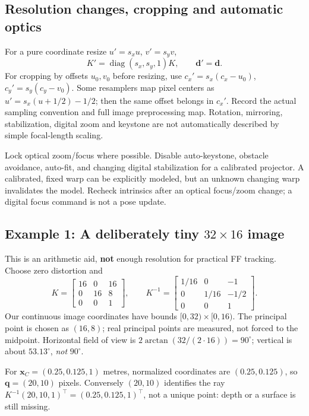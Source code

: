 \documentclass[11pt,a4paper]{article}
\newcommand{\pt}[1]{\bm{x}_{#1}}
\begin{document}
\subsection{Resolution changes, cropping and automatic optics}
For a pure coordinate resize $u'=s_xu$, $v'=s_yv$,
\begin{equation}
K'=\operatorname{diag}(s_x,s_y,1)K,\qquad \bm{d}'=\bm{d}.
\label{eq:resize}
\end{equation}
For cropping by offsets $u_0,v_0$ before resizing, use
$c_x'=s_x(c_x-u_0)$, $c_y'=s_y(c_y-v_0)$.
Some resamplers map pixel centers as
$u'=s_x(u+1/2)-1/2$; then the same offset belongs in $c_x'$.
Record the actual sampling convention and full image preprocessing map.
Rotation, mirroring, stabilization, digital zoom and keystone are not
automatically described by simple focal-length scaling.

Lock optical zoom/focus where possible. Disable auto-keystone, obstacle
avoidance, auto-fit, and changing digital stabilization for a calibrated
projector. A calibrated, fixed warp can be explicitly modeled, but an
unknown changing warp invalidates the model. Recheck intrinsics after an
optical focus/zoom change; a digital focus command is not a pose update.

\subsection{Example 1: A deliberately tiny $32\times16$ image}
This is an arithmetic aid, \textbf{not} enough resolution for practical FF
tracking. Choose zero distortion and
\begin{equation}
K=\begin{bmatrix}16&0&16\\0&16&8\\0&0&1\end{bmatrix},\qquad
K^{-1}=\begin{bmatrix}1/16&0&-1\\0&1/16&-1/2\\0&0&1\end{bmatrix}.
\label{eq:tinyK}
\end{equation}
Our continuous image coordinates have bounds $[0,32)\times[0,16)$.
The principal point is chosen as $(16,8)$; real principal points are
measured, not forced to the midpoint. Horizontal field of view is
$2\arctan(32/(2\cdot16))=90^\circ$; vertical is about $53.13^\circ$,
\emph{not} $90^\circ$.

For $\pt{C}=(0.25,0.125,1)$ metres, normalized coordinates are
$(0.25,0.125)$, so $\bm{q}=(20,10)$ pixels.
Conversely $(20,10)$ identifies the ray
$K^{-1}(20,10,1)^\top=(0.25,0.125,1)^\top$, not a unique point:
depth or a surface is still missing.
\end{document}
